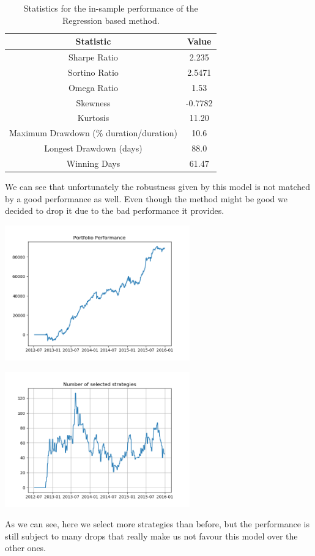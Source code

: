 \begin{table}
	\centering
	\begin{tabular}{c|c}
		\textbf{Statistic} & \textbf{Value} \\\hline
		Sharpe Ratio & 2.235 \\ 
		Sortino Ratio & 2.5471 \\ 
		Omega Ratio & 1.53 \\ 
		Skewness & -0.7782 \\ 
		Kurtosis & 11.20 \\ 
		Maximum Drawdown (\% duration/duration) & 10.6 \\ 
		Longest Drawdown (days) & 88.0 \\ 
		Winning Days & 61.47 \\ 
	\end{tabular}
	\caption{\label{tab:widgets} Statistics for the in-sample performance of the Regression based method.}
\end{table}

We can see that unfortunately the robustness given by this model is not matched by a good performance as well. Even though the method might be good we decided to drop it due to the bad performance it provides.  

\begin{center}
	\centering
	\includegraphics[width=0.6\textwidth]{GridSearches/Regression_Based/in_sample_performance.png}
	\label{Average_Drawdown_3}
\end{center}


\begin{center}
	\centering
	\includegraphics[width=0.6\textwidth]{GridSearches/Regression_Based/num_strats_in_sample.png}
	\label{Average_Drawdown_in_sample}
\end{center}

As we can see, here we select more strategies than before, but the performance is still subject to many drops that really make us not favour this model over the other ones.